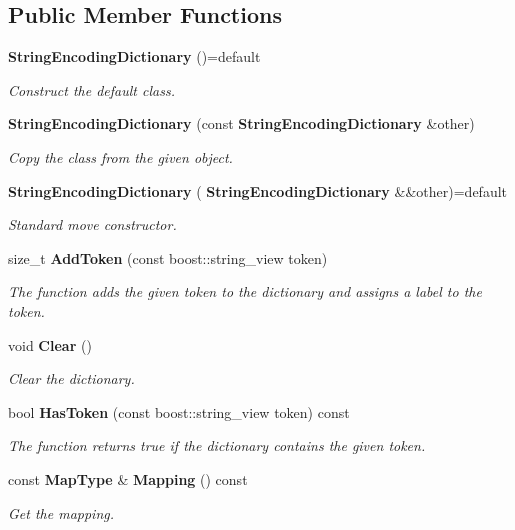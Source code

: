 \subsection*{Public Member Functions}
\begin{DoxyCompactItemize}
\item 
\textbf{ String\+Encoding\+Dictionary} ()=default
\begin{DoxyCompactList}\small\item\em Construct the default class. \end{DoxyCompactList}\item 
\textbf{ String\+Encoding\+Dictionary} (const \textbf{ String\+Encoding\+Dictionary} \&other)
\begin{DoxyCompactList}\small\item\em Copy the class from the given object. \end{DoxyCompactList}\item 
\textbf{ String\+Encoding\+Dictionary} (\textbf{ String\+Encoding\+Dictionary} \&\&other)=default
\begin{DoxyCompactList}\small\item\em Standard move constructor. \end{DoxyCompactList}\item 
size\+\_\+t \textbf{ Add\+Token} (const boost\+::string\+\_\+view token)
\begin{DoxyCompactList}\small\item\em The function adds the given token to the dictionary and assigns a label to the token. \end{DoxyCompactList}\item 
void \textbf{ Clear} ()
\begin{DoxyCompactList}\small\item\em Clear the dictionary. \end{DoxyCompactList}\item 
bool \textbf{ Has\+Token} (const boost\+::string\+\_\+view token) const
\begin{DoxyCompactList}\small\item\em The function returns true if the dictionary contains the given token. \end{DoxyCompactList}\item 
const \textbf{ Map\+Type} \& \textbf{ Mapping} () const
\begin{DoxyCompactList}\small\item\em Get the mapping. \end{DoxyCompactList}\item 

\end{DoxyCompactItemize}

